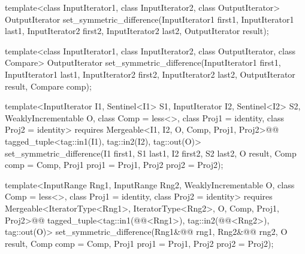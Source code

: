 %
\begin{removedblock}
\begin{itemdecl}
template<class InputIterator1, class InputIterator2,
         class OutputIterator>
  OutputIterator
    set_symmetric_difference(InputIterator1 first1, InputIterator1 last1,
                             InputIterator2 first2, InputIterator2 last2,
                             OutputIterator result);

template<class InputIterator1, class InputIterator2,
         class OutputIterator, class Compare>
  OutputIterator
    set_symmetric_difference(InputIterator1 first1, InputIterator1 last1,
                             InputIterator2 first2, InputIterator2 last2,
                             OutputIterator result, Compare comp);
\end{itemdecl}
\end{removedblock}
\begin{addedblock}
\begin{itemdecl}
template<InputIterator I1, Sentinel<I1> S1, InputIterator I2, Sentinel<I2> S2,
    WeaklyIncrementable O, class Comp = less<>, class Proj1 = identity, class Proj2 = identity>
  requires Mergeable<I1, I2, O, Comp, Proj1, Proj2>@\newtxt{()}@
  tagged_tuple<tag::in1(I1), tag::in2(I2), tag::out(O)>
    set_symmetric_difference(I1 first1, S1 last1, I2 first2, S2 last2, O result,
                             Comp comp = Comp{}, Proj1 proj1 = Proj1{},
                             Proj2 proj2 = Proj2{});

template<InputRange Rng1, InputRange Rng2, WeaklyIncrementable O,
    class Comp = less<>, class Proj1 = identity, class Proj2 = identity>
  requires Mergeable<IteratorType<Rng1>, IteratorType<Rng2>, O, Comp, Proj1, Proj2>@\newtxt{()}@
  tagged_tuple<tag::in1(@@<Rng1>),
               tag::in2(@@<Rng2>),
               tag::out(O)>
    set_symmetric_difference(Rng1&@\newtxt{\&}@ rng1, Rng2&@\newtxt{\&}@ rng2, O result, Comp comp = Comp{},
                             Proj1 proj1 = Proj1{}, Proj2 proj2 = Proj2{});
\end{itemdecl}
\end{addedblock}

